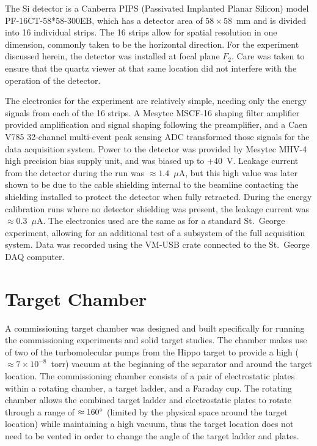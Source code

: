 The Si detector is a Canberra PIPS (Passivated Implanted Planar Silicon)
model PF-16CT-58*58-300EB, which has a detector area of $58\times 58$~mm
and is divided into 16 individual strips. The 16 strips allow for
spatial resolution in one dimension, commonly taken to be the horizontal
direction. For the experiment discussed herein, the detector was
installed at focal plane $F_2$. Care was taken to ensure that the quartz
viewer at that same location did not interfere with the operation of the
detector.

The electronics for the experiment are relatively simple, needing only
the energy signals from each of the 16 strips. A Mesytec MSCF-16 shaping
filter amplifier provided amplification and signal shaping following the
preamplifier, and a Caen V785 32-channel multi-event peak sensing ADC
transformed those signals for the data acquisition system. Power to the
detector was provided by Mesytec MHV-4 high precision bias supply unit,
and was biased up to +40~V. Leakage current from the detector during the
run was $\approx 1.4$~$\mu$A, but this high value was later shown to be
due to the cable shielding internal to the beamline contacting the
shielding installed to protect the detector when fully retracted. During
the energy calibration runs where no detector shielding was present, the
leakage current was $\approx 0.3$~$\mu$A. The electronics used are the
same as for a standard St.\ George experiment, allowing for an
additional test of a subsystem of the full acquisition system. Data was
recorded using the VM-USB crate connected to the St.\ George DAQ
computer.


\section{Target Chamber}
\label{sec:target}

A commissioning target chamber was designed and built specifically for
running the commissioning experiments and solid target studies. The
chamber makes use of two of the turbomolecular pumps from the Hippo
target to provide a high ($\approx 7\times 10^{-8}$~torr) vacuum at the
beginning of the separator and around the target location. The
commissioning chamber consists of a pair of electrostatic plates within
a rotating chamber, a target ladder, and a Faraday cup. The rotating
chamber allows the combined target ladder and electrostatic plates to
rotate through a range of $\approx 160\degree$ (limited by the physical
space around the target location) while maintaining a high vacuum, thus
the target location does not need to be vented in order to change the
angle of the target ladder and plates.

